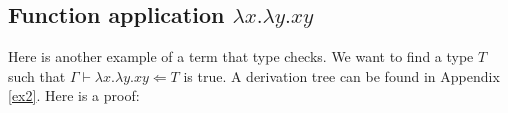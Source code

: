 \begin{example}
     \begin{comment} This leaves us with one hypothesis to resolve, $\Gamma , x : A \vdash x \Leftarrow B$ which is clearly true by the variable rule (Var) and nothing else. Thus as long as we can find two types $A$ and $B$
    
     Our inversion lemma will tell us exactly which rules let us get to this point. So we will essentially be performing a tree search.

    
     Firstly we need to switch modes to get $\lambda x . x \Rightarrow T$. But mode switching also lets us change our type just as long as we have an equality. We will not be able to resolve this equality, but we can keep a hold of it as a hypothetical.
    \begin{prooftree}
        \AxiomC{$\Gamma \vdash $}
        \AxiomC{$$}
        \BinaryInfC{$\Gamma \vdash \lambda x . x \Rightarrow T$}
    \end{prooftree}
\end{example}

     \end{comment}

\subsection{Function application $\lambda x . \lambda y . x y$}

\begin{example}
    Here is another example of a term that type checks. We want to find a type $T$ such that $\Gamma \vdash \lambda x . \lambda y . x y \Leftarrow T$ is true. A derivation tree can be found in Appendix \ref{ex2}. Here is a proof:
        

\end{example}
\end{example}
